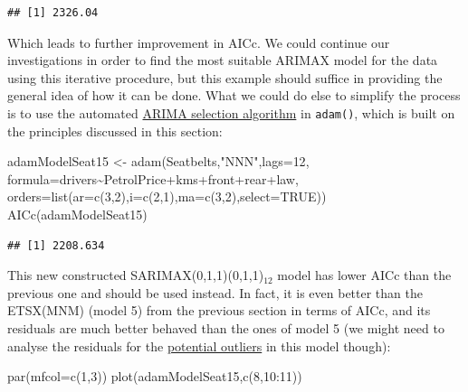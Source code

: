 \documentclass[
]{book}
\newenvironment{Shaded}{\begin{snugshade}}{\end{snugshade}}
\newcommand{\AttributeTok}[1]{\textcolor[rgb]{0.77,0.63,0.00}{#1}}
\newcommand{\ConstantTok}[1]{\textcolor[rgb]{0.00,0.00,0.00}{#1}}
\newcommand{\DecValTok}[1]{\textcolor[rgb]{0.00,0.00,0.81}{#1}}
\newcommand{\FunctionTok}[1]{\textcolor[rgb]{0.00,0.00,0.00}{#1}}
\newcommand{\NormalTok}[1]{#1}
\newcommand{\OtherTok}[1]{\textcolor[rgb]{0.56,0.35,0.01}{#1}}
\newcommand{\SpecialCharTok}[1]{\textcolor[rgb]{0.00,0.00,0.00}{#1}}
\newcommand{\StringTok}[1]{\textcolor[rgb]{0.31,0.60,0.02}{#1}}
\theoremstyle{definition}
\theoremstyle{definition}
\theoremstyle{definition}
\theoremstyle{definition}
\theoremstyle{remark}
\begin{document}
\begin{verbatim}
## [1] 2326.04
\end{verbatim}

Which leads to further improvement in AICc. We could continue our investigations in order to find the most suitable ARIMAX model for the data using this iterative procedure, but this example should suffice in providing the general idea of how it can be done. What we could do else to simplify the process is to use the automated \protect\hyperlink{ARIMASelection}{ARIMA selection algorithm} in \texttt{adam()}, which is built on the principles discussed in this section:

\begin{Shaded}
\begin{Highlighting}[]
\NormalTok{adamModelSeat15 }\OtherTok{\textless{}{-}}
  \FunctionTok{adam}\NormalTok{(Seatbelts,}\StringTok{"NNN"}\NormalTok{,}\AttributeTok{lags=}\DecValTok{12}\NormalTok{,}
       \AttributeTok{formula=}\NormalTok{drivers}\SpecialCharTok{\textasciitilde{}}\NormalTok{PetrolPrice}\SpecialCharTok{+}\NormalTok{kms}\SpecialCharTok{+}\NormalTok{front}\SpecialCharTok{+}\NormalTok{rear}\SpecialCharTok{+}\NormalTok{law,}
       \AttributeTok{orders=}\FunctionTok{list}\NormalTok{(}\AttributeTok{ar=}\FunctionTok{c}\NormalTok{(}\DecValTok{3}\NormalTok{,}\DecValTok{2}\NormalTok{),}\AttributeTok{i=}\FunctionTok{c}\NormalTok{(}\DecValTok{2}\NormalTok{,}\DecValTok{1}\NormalTok{),}\AttributeTok{ma=}\FunctionTok{c}\NormalTok{(}\DecValTok{3}\NormalTok{,}\DecValTok{2}\NormalTok{),}\AttributeTok{select=}\ConstantTok{TRUE}\NormalTok{))}
\FunctionTok{AICc}\NormalTok{(adamModelSeat15)}
\end{Highlighting}
\end{Shaded}

\begin{verbatim}
## [1] 2208.634
\end{verbatim}

This new constructed SARIMAX(0,1,1)(0,1,1)\(_{12}\) model has lower AICc than the previous one and should be used instead. In fact, it is even better than the ETSX(MNM) (model 5) from the previous section in terms of AICc, and its residuals are much better behaved than the ones of model 5 (we might need to analyse the residuals for the \protect\hyperlink{diagnosticsOutliers}{potential outliers} in this model though):

\begin{Shaded}
\begin{Highlighting}[]
\FunctionTok{par}\NormalTok{(}\AttributeTok{mfcol=}\FunctionTok{c}\NormalTok{(}\DecValTok{1}\NormalTok{,}\DecValTok{3}\NormalTok{))}
\FunctionTok{plot}\NormalTok{(adamModelSeat15,}\FunctionTok{c}\NormalTok{(}\DecValTok{8}\NormalTok{,}\DecValTok{10}\SpecialCharTok{:}\DecValTok{11}\NormalTok{))}
\end{Highlighting}
\end{Shaded}
\end{document}

